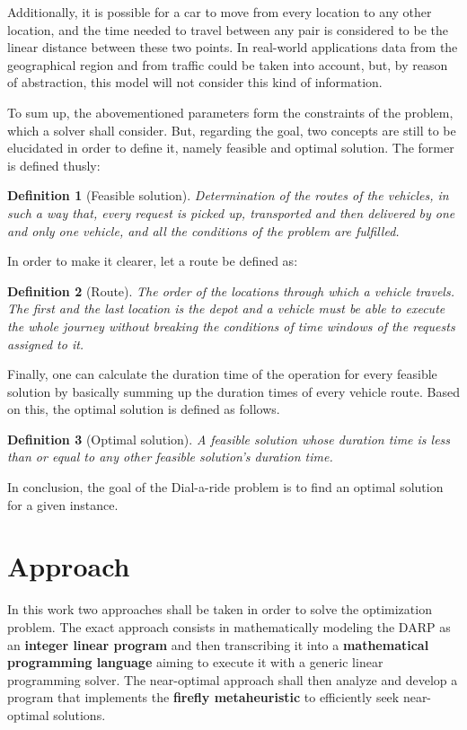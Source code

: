 \documentclass[tuberlin,cic,tc,openright,english,noabntcite,oneside]{iiufrgs}
\newtheorem{definition}{Definition}
\begin{document}
Additionally, it is possible for a car to move from every location to any other location, and the time needed to travel between any pair is considered to be the linear distance between these two points. In real-world applications data from the geographical region and from traffic could be taken into account, but, by reason of abstraction, this model will not consider this kind of information.

To sum up, the abovementioned parameters form the constraints of the problem, which a solver shall consider. But, regarding the goal, two concepts are still to be elucidated in order to define it, namely feasible and optimal solution. The former is defined thusly:
\begin{definition}[Feasible solution]
Determination of the routes of the vehicles, in such a way that, every request is picked up, transported and then delivered by one and only one vehicle, and all the conditions of the problem are fulfilled.
\end{definition}

In order to make it clearer, let a route be defined as:
\begin{definition}[Route]
The order of the locations through which a vehicle travels. The first and the last location is the depot and a vehicle must be able to execute the whole journey without breaking the conditions of time windows of the requests assigned to it.
\end{definition}

Finally, one can calculate the duration time of the operation for every feasible solution by basically summing up the duration times of every vehicle route. Based on this, the optimal solution is defined as follows.
\begin{definition}[Optimal solution]
A feasible solution whose duration time is less than or equal to any other feasible solution's duration time.
\end{definition}

In conclusion, the goal of the Dial-a-ride problem is to find an optimal solution for a given instance.

\section{Approach}
In this work two approaches shall be taken in order to solve the optimization problem. The exact approach consists in mathematically modeling the DARP as an \textbf{integer linear program} and then transcribing it into a \textbf{mathematical programming language} aiming to execute it with a generic linear programming solver. The near-optimal approach shall then analyze and develop a program that implements the \textbf{firefly metaheuristic} to efficiently seek near-optimal solutions.
\end{document}
